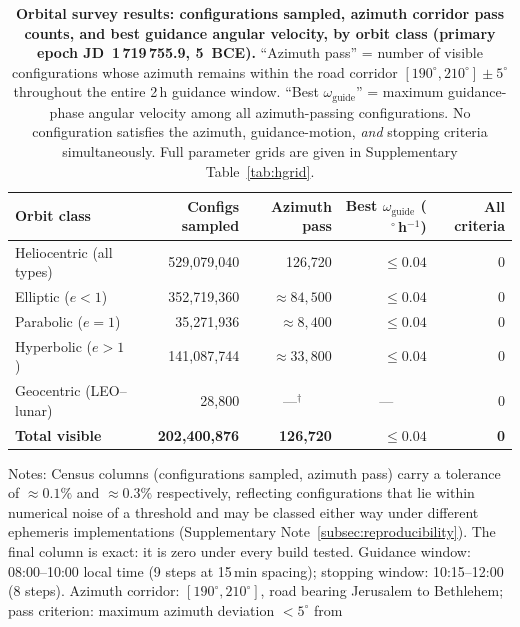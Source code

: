 \documentclass[11pt,a4paper]{article}
\begin{document}
\begin{table}[htbp]
\centering\small
\caption{\textbf{Orbital survey results: configurations sampled, azimuth
  corridor pass counts, and best guidance angular velocity, by orbit class
  (primary epoch JD~1\,719\,755.9, 5~BCE).}
  ``Azimuth pass'' = number of visible configurations whose azimuth
  remains within the road corridor $[190^\circ,\!210^\circ]\pm5^\circ$
  throughout the entire 2\,h guidance window.
  ``Best $\omega_\text{guide}$'' = maximum guidance-phase angular velocity
  among all azimuth-passing configurations.
  No configuration satisfies the azimuth, guidance-motion, \emph{and}
  stopping criteria simultaneously.
  Full parameter grids are given in Supplementary Table~\ref{tab:hgrid}.}
\label{tab:survey}
\begin{tabular}{@{}lrrrr@{}}
\toprule
Orbit class & Configs sampled & Azimuth pass & Best $\omega_\text{guide}$
  ($^\circ$\,h$^{-1}$) & All criteria \\
\midrule
Heliocentric (all types) & 529,079,040 & 126,720 & $\leq 0.04$ & 0 \\
\quad Elliptic ($e<1$)   & 352,719,360 & $\approx\!84{,}500$ & $\leq 0.04$ & 0 \\
\quad Parabolic ($e=1$)  & 35,271,936  & $\approx\!8{,}400$  & $\leq 0.04$ & 0 \\
\quad Hyperbolic ($e>1$) & 141,087,744 & $\approx\!33{,}800$ & $\leq 0.04$ & 0 \\
Geocentric (LEO–lunar)   & 28,800      & \multicolumn{1}{c}{---$^\dagger$}
  & \multicolumn{1}{c}{---} & 0 \\
\midrule
\textbf{Total visible}   & \textbf{202,400,876} & \textbf{126,720} &
  $\leq\mathbf{0.04}$ & \textbf{0} \\
\bottomrule
\end{tabular}
\par\smallskip\begin{minipage}{0.95\linewidth}\footnotesize Notes: Census columns (configurations sampled, azimuth pass) carry a
tolerance of ${\approx}0.1\%$ and ${\approx}0.3\%$ respectively, reflecting
configurations that lie within numerical noise of a threshold and may be
classed either way under different ephemeris implementations
(Supplementary Note~\ref{subsec:reproducibility}).  The final column is exact: it is zero under every
build tested.
Guidance window: 08:00--10:00 local time (9 steps at
15\,min spacing); stopping window: 10:15--12:00 (8 steps).
Azimuth corridor: $[190^\circ, 210^\circ]$, road bearing Jerusalem to
Bethlehem; pass criterion: maximum azimuth deviation $<\!5^\circ$ from

\end{minipage}
\end{table}
\end{document}
